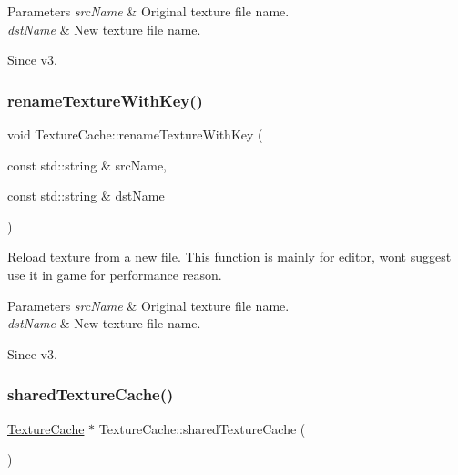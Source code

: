 \begin{DoxyParams}{Parameters}
{\em src\+Name} & Original texture file name. \\
\hline
{\em dst\+Name} & New texture file name.\\
\hline
\end{DoxyParams}
\begin{DoxySince}{Since}
v3. 
\end{DoxySince}
\mbox{\label{classTextureCache_a8735ea61a274834e6b3db7165ce2c26d}} 
\subsubsection{\texorpdfstring{rename\+Texture\+With\+Key()}{renameTextureWithKey()}\hspace{0.1cm}{\footnotesize\ttfamily [2/2]}}
{\footnotesize\ttfamily void Texture\+Cache\+::rename\+Texture\+With\+Key (\begin{DoxyParamCaption}\item[{const std\+::string \&}]{src\+Name,  }\item[{const std\+::string \&}]{dst\+Name }\end{DoxyParamCaption})}

Reload texture from a new file. This function is mainly for editor, won\textquotesingle{}t suggest use it in game for performance reason.


\begin{DoxyParams}{Parameters}
{\em src\+Name} & Original texture file name. \\
\hline
{\em dst\+Name} & New texture file name.\\
\hline
\end{DoxyParams}
\begin{DoxySince}{Since}
v3. 
\end{DoxySince}
\mbox{\label{classTextureCache_a77a4493baac10bdfc2c7c91361a9f622}} 
\subsubsection{\texorpdfstring{shared\+Texture\+Cache()}{sharedTextureCache()}\hspace{0.1cm}{\footnotesize\ttfamily [1/2]}}
{\footnotesize\ttfamily \hyperlink{classTextureCache}{Texture\+Cache} $\ast$ Texture\+Cache\+::shared\+Texture\+Cache (\begin{DoxyParamCaption}{ }\end{DoxyParamCaption})\hspace{0.3cm}{\ttfamily [static]}}

